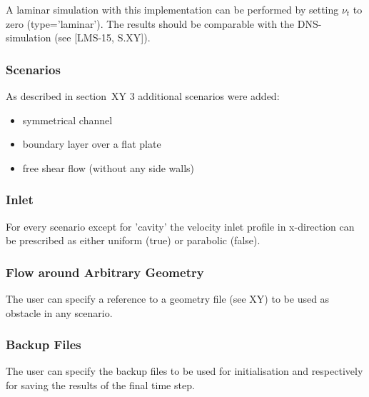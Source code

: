 \noii A laminar simulation with this implementation can be performed by setting $\nu_t$ to zero (type='laminar'). The results should be comparable with the DNS-simulation (see [LMS-15, S.XY]).  

\subsubsection*{Scenarios}

As described in section~XY 3 additional scenarios were added:

\begin{itemize}
\item symmetrical channel
\item boundary layer over a flat plate
\item free shear flow (without any side walls)
\end{itemize}

\subsubsection*{Inlet}

For every scenario except for 'cavity' the velocity inlet profile in x-direction can be prescribed as either uniform (true) or parabolic (false).


\subsubsection*{Flow around Arbitrary Geometry}

The user can specify a reference to a geometry file (see XY) to be used as obstacle in any scenario.


\subsubsection*{Backup Files}

The user can specify the backup files to be used for initialisation and respectively for saving the results of the final time step.



\clearpage

